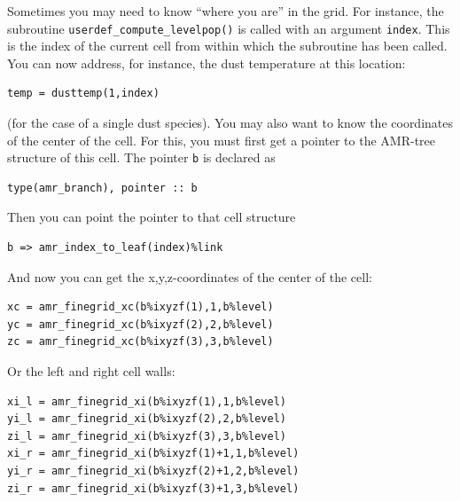 \documentclass{report}
\newenvironment{asciibox}%
  {\begin{list}{}{%
    \setlength{\topsep}{0.5em}%
    \setlength{\parskip}{0em}%
    \setlength{\parsep}{0em}%
    \setlength{\itemsep}{0em}%
    \setlength{\rightmargin}{0em}%
    \setlength{\leftmargin}{3.0em}%
    \setlength{\labelsep}{1em}%
    \setlength{\labelwidth}{2em}%
  }\normalfont\footnotesize\item}
  {\end{list}}
\begin{document}
Sometimes you may need to know ``where you are'' in the grid. For instance,
the subroutine {\small\tt userdef\_compute\_levelpop()} is called with
an argument {\small\tt index}. This is the index of the current cell
from within which the subroutine has been called. You can now address,
for instance, the dust temperature at this location:
\begin{asciibox}\begin{verbatim}
temp = dusttemp(1,index)
\end{verbatim}\end{asciibox}
(for the case of a single dust species). You may also want to know 
the coordinates of the center of the cell. For this, you must first
get a pointer to the AMR-tree structure of this cell. The pointer 
{\small\tt b} is declared as
\begin{asciibox}\begin{verbatim}
type(amr_branch), pointer :: b
\end{verbatim}\end{asciibox}
Then you can point the pointer to that cell structure
\begin{asciibox}\begin{verbatim}
b => amr_index_to_leaf(index)%link
\end{verbatim}\end{asciibox}
And now you can get the x,y,z-coordinates of the center of the cell:
\begin{asciibox}\begin{verbatim}
xc = amr_finegrid_xc(b%ixyzf(1),1,b%level)
yc = amr_finegrid_xc(b%ixyzf(2),2,b%level)
zc = amr_finegrid_xc(b%ixyzf(3),3,b%level)
\end{verbatim}\end{asciibox}
Or the left and right cell walls:
\begin{asciibox}\begin{verbatim}
xi_l = amr_finegrid_xi(b%ixyzf(1),1,b%level)
yi_l = amr_finegrid_xi(b%ixyzf(2),2,b%level)
zi_l = amr_finegrid_xi(b%ixyzf(3),3,b%level)
xi_r = amr_finegrid_xi(b%ixyzf(1)+1,1,b%level)
yi_r = amr_finegrid_xi(b%ixyzf(2)+1,2,b%level)
zi_r = amr_finegrid_xi(b%ixyzf(3)+1,3,b%level)
\end{verbatim}\end{asciibox}
\end{document}
